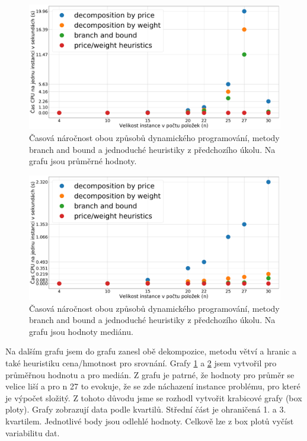 \documentclass[11pt]{article}
\begin{document}
\begin{figure}[h]\centering
	\includegraphics[scale=0.2]{img/tDavg}
 	\caption[2]{Časová náročnost obou způsobů dynamického programování, metody branch and bound a jednoduché heuristiky z předchozího úkolu. Na grafu jsou průměrné hodnoty.}\label{fig:2}
 \end{figure} 	
 \begin{figure}[h]\centering
	\includegraphics[scale=0.2]{img/tD50}
 	\caption[2]{Časová náročnost obou způsobů dynamického programování, metody branch and bound a jednoduché heuristiky z předchozího úkolu. Na grafu jsou hodnoty mediánu.}\label{fig:3}
 \end{figure} 	


Na dalším grafu jsem do grafu zanesl obě dekompozice, metodu větví a hranic a také heuristiku cena/hmotnost pro srovnání. Grafy \ref{fig:2} a \ref{fig:3} jsem vytvořil pro průměřnou hodnotu a pro medián. Z grafu je patrné, že hodnoty pro průměr se velice liší a pro n 27 to evokuje, že se zde náchazení instance problému, pro které je výpočet složitý. Z tohoto důvodu jsme se rozhodl vytvořit krabicové grafy (box ploty). Grafy zobrazují data podle kvartilů. Střední část je ohraničená 1. a 3. kvartilem. Jednotlivé body jsou odlehlé hodnoty. Celkově lze z box plotů vyčíst variabilitu dat. 
\end{document}
